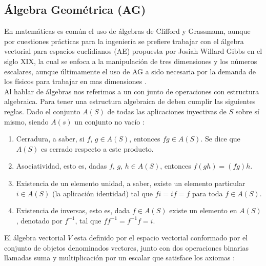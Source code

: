    \subsection{Álgebra Geométrica (AG)}
    
        En matemáticas es común el uso de álgebras de Clifford y Grassmann, aunque por cuestiones prácticas para la ingeniería se prefiere trabajar con el álgebra vectorial para espacios euclidianos (AE) propuesta por Josiah Willard Gibbs en el siglo XIX, la cual se enfoca a la manipulación de tres dimensiones y los números escalares,  aunque últimamente el uso de AG a  sido necesaria por la demanda de los físicos para trabajar en mas dimensiones \cite{FoundOfAGC}.\\
        
        Al hablar de álgebras nos referimos a un con junto de operaciones con estructura algebraica. Para tener una estructura algebraica de deben cumplir  las siguientes reglas. Dado el conjunto $A(S)$ de todas las aplicaciones inyectivas de $S$ sobre sí mismo, siendo $A(s)$ un conjunto no vacío \cite{herstein1988algebra}:
        
        \begin{enumerate}
        	\item Cerradura, a saber, si $f$, $g \in A(S)$, entonces $fg \in A(S)$. Se dice que $A(S)$ es cerrado respecto a este producto.
        	\item Asociatividad, esto es, dadas $f$, $g$, $h \in A(S)$, entonces $f(gh) = (fg)h$.
        	\item  Existencia de un elemento unidad, a saber, existe un elemento	particular $i \in A(S)$ (la aplicación identidad) tal que $fi = if = f$ para toda $f \in A (S)$.
        	\item  Existencia de inversas, esto es, dada $f \in A(S)$ existe un elemento en $A(S)$, denotado por $f^{-1}$, tal que $ff^{-1} = f^{-1}f = i$. 
        \end{enumerate}
        
        
        El álgebra vectorial $V$ esta definido por el espacio vectorial conformado por el conjunto de objetos denominados vectores, junto con dos operaciones binarias llamadas suma y multiplicación por un escalar que satisface los axiomas \cite{grossman2008algebra}:
        

